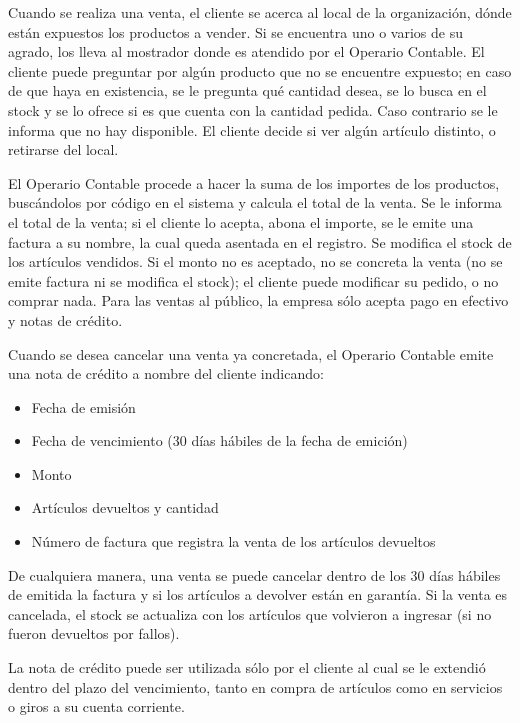 \documentclass[12pt]{extarticle}
\begin{document}
\begin{spacing}{1.2}
        Cuando se realiza una venta, el cliente se acerca al local de la organización, dónde están expuestos los productos a vender. Si se encuentra uno o varios de su agrado, los lleva al mostrador donde es atendido por el Operario Contable. 
        El cliente puede preguntar por algún producto que no se encuentre expuesto; en caso de que haya en existencia, se le pregunta qué cantidad desea, se lo busca en el stock y se lo ofrece si es que cuenta con la cantidad pedida. Caso contrario se le informa que no hay disponible. El cliente decide si ver algún artículo distinto, o retirarse del local.

        El Operario Contable procede a hacer la suma de los importes de los productos, buscándolos por código en el sistema y calcula el total de la venta. Se le informa el total de la venta; si el cliente lo acepta, abona el importe, se le emite una factura a su nombre, la cual queda asentada en el registro. Se modifica el stock de los artículos vendidos. 
        Si el monto no es aceptado, no se concreta la venta (no se emite factura ni se modifica el stock); el cliente puede modificar su pedido, o no comprar nada.
        Para las ventas al público, la empresa sólo acepta pago en efectivo y notas de crédito.

        Cuando se desea cancelar una venta ya concretada, el Operario Contable emite una nota de crédito a nombre del cliente indicando:
        \begin{itemize}
            \item Fecha de emisión
            \item Fecha de vencimiento (30 días hábiles de la fecha de emición)
            \item Monto
            \item Artículos devueltos y cantidad
            \item Número de factura que registra la venta de los artículos devueltos
        \end{itemize}
        De cualquiera manera, una venta se puede cancelar dentro de los 30 días hábiles de emitida la factura y si los artículos a devolver están en garantía. Si la venta es cancelada, el stock se actualiza con los artículos que volvieron a ingresar (si no fueron devueltos por fallos).

        La nota de crédito puede ser utilizada sólo por el cliente al cual se le extendió dentro del plazo del vencimiento, tanto en compra de artículos como en servicios o giros a su cuenta corriente.


\end{spacing}
\end{document}
